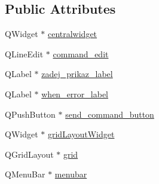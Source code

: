 \subsection*{Public Attributes}
\begin{DoxyCompactItemize}
\item 
Q\-Widget $\ast$ \hyperlink{classUi__game__window_aa46a61bfcdb8c9d7706974913e944cbe}{centralwidget}
\item 
Q\-Line\-Edit $\ast$ \hyperlink{classUi__game__window_a0881fadd6d3e567683404dd2aea66dd8}{command\-\_\-edit}
\item 
Q\-Label $\ast$ \hyperlink{classUi__game__window_a309b06ba0af4527d2e78f91d03bc08d4}{zadej\-\_\-prikaz\-\_\-label}
\item 
Q\-Label $\ast$ \hyperlink{classUi__game__window_a8b1b310fc381161f44c720fa8ea3c4d6}{when\-\_\-error\-\_\-label}
\item 
Q\-Push\-Button $\ast$ \hyperlink{classUi__game__window_aef389fef0c6667e488d979c2ba461237}{send\-\_\-command\-\_\-button}
\item 
Q\-Widget $\ast$ \hyperlink{classUi__game__window_a8447a074aadb12177aba7e7e1ba8cb61}{grid\-Layout\-Widget}
\item 
Q\-Grid\-Layout $\ast$ \hyperlink{classUi__game__window_af41420b2a865afe1600e82c56b788b86}{grid}
\item 
Q\-Menu\-Bar $\ast$ \hyperlink{classUi__game__window_a264dfe7db0e67d4a69d2d21ede691982}{menubar}
\end{DoxyCompactItemize}


